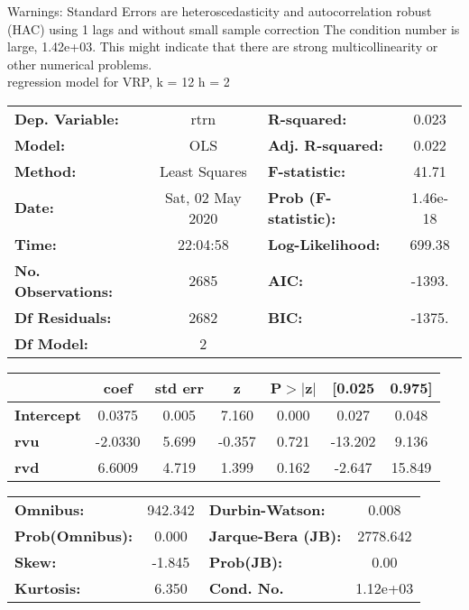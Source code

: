 Warnings: \newline
 [1] Standard Errors are heteroscedasticity and autocorrelation robust (HAC) using 1 lags and without small sample correction \newline
 [2] The condition number is large, 1.42e+03. This might indicate that there are \newline
 strong multicollinearity or other numerical problems.\\ 

regression model for VRP, k = 12 h = 2\begin{center}
\begin{tabular}{lclc}
\toprule
\textbf{Dep. Variable:}    &       rtrn       & \textbf{  R-squared:         } &     0.023   \\
\textbf{Model:}            &       OLS        & \textbf{  Adj. R-squared:    } &     0.022   \\
\textbf{Method:}           &  Least Squares   & \textbf{  F-statistic:       } &     41.71   \\
\textbf{Date:}             & Sat, 02 May 2020 & \textbf{  Prob (F-statistic):} &  1.46e-18   \\
\textbf{Time:}             &     22:04:58     & \textbf{  Log-Likelihood:    } &    699.38   \\
\textbf{No. Observations:} &        2685      & \textbf{  AIC:               } &    -1393.   \\
\textbf{Df Residuals:}     &        2682      & \textbf{  BIC:               } &    -1375.   \\
\textbf{Df Model:}         &           2      & \textbf{                     } &             \\
\bottomrule
\end{tabular}
\begin{tabular}{lcccccc}
                   & \textbf{coef} & \textbf{std err} & \textbf{z} & \textbf{P$> |$z$|$} & \textbf{[0.025} & \textbf{0.975]}  \\
\midrule
\textbf{Intercept} &       0.0375  &        0.005     &     7.160  &         0.000        &        0.027    &        0.048     \\
\textbf{rvu}       &      -2.0330  &        5.699     &    -0.357  &         0.721        &      -13.202    &        9.136     \\
\textbf{rvd}       &       6.6009  &        4.719     &     1.399  &         0.162        &       -2.647    &       15.849     \\
\bottomrule
\end{tabular}
\begin{tabular}{lclc}
\textbf{Omnibus:}       & 942.342 & \textbf{  Durbin-Watson:     } &    0.008  \\
\textbf{Prob(Omnibus):} &   0.000 & \textbf{  Jarque-Bera (JB):  } & 2778.642  \\
\textbf{Skew:}          &  -1.845 & \textbf{  Prob(JB):          } &     0.00  \\
\textbf{Kurtosis:}      &   6.350 & \textbf{  Cond. No.          } & 1.12e+03  \\
\bottomrule
\end{tabular}
\end{center}

